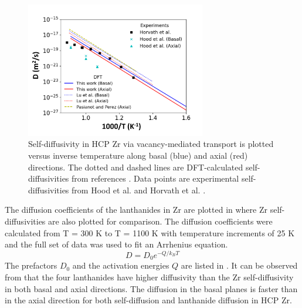 \documentclass[preprint,12pt]{elsarticle}
\begin{document}
\begin{figure}[h!]
    \centering
    \includegraphics[width=0.7\textwidth]{4_self_diff_added_f0_dft_literature.jpg}
    \caption{Self-diffusivity in HCP Zr via vacancy-mediated transport is plotted versus inverse temperature along basal (blue) and axial (red) directions. The dotted and dashed lines are DFT-calculated self-diffusivities from references \cite{pasianot_issues_2012, lu_first-principles_2018}. Data points are experimental self-diffusivities from Hood et al. \cite{hood_self-_1997} and Horvath et al. \cite{horvath_anomalous_1984}.}
    \label{fig:self_diff}
\end{figure}

The diffusion coefficients of the lanthanides in Zr are plotted in  where Zr self-diffusivities are also plotted for comparison.  The diffusion coefficients were calculated from T = 300 K to T = 1100 K with temperature increments of 25 K and the full set of data was used to fit an Arrhenius equation.
\begin{equation}
    D = D_0 e^{-Q/{k_B T}}
\end{equation}
The prefactors $D_0$ and the activation energies $Q$ are listed in . It can be observed from  that the four lanthanides have higher diffusivity than the Zr self-diffusivity in both basal and axial directions. The diffusion in the basal planes is faster than in the axial direction for both self-diffusion and lanthanide diffusion in HCP Zr.
\end{document}
